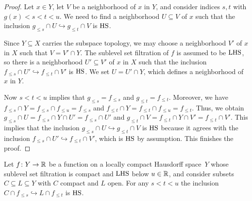 \begin{proof}
	Let $x \in Y$, let $V$ be a neighborhood of $x$ in $Y$, and consider indices $s,t$ with $g(x) < s < t < u$.
	We need to find a neighborhood $U \subseteq V$ of $x$ such that the inclusion $g_{\leq s} \cap U \hookrightarrow g_{\leq t} \cap V$ is $\mathrm{HS}$.

	Since $Y \subseteq X$ carries the subspace topology, we may choose a neighborhood $V'$ of $x$ in $X$ such that $V = V' \cap Y$.
	The sublevel set filtration of $f$ is assumed to be $\mathrm{LHS}$, so there is a neighborhood $U' \subseteq V'$ of $x$ in $X$ such that the inclusion $f_{\leq s} \cap U' \hookrightarrow f_{\leq t} \cap V'$ is $\mathrm{HS}$.
	We set $U = U' \cap Y$, which defines a neighborhood of $x$ in $Y$.

	Now $s < t < u$ implies that $g_{\leq s} = f_{\leq s}$ and $g_{\leq t} = f_{\leq t}$.
	Moreover, we have $f_{\leq s} \cap Y = f_{\leq s} \cap f_{\leq u} = f_{\leq s}$ and $f_{\leq t} \cap Y = f_{\leq t} \cap f_{\leq u} = f_{\leq t}$.
	Thus, we obtain $g_{\leq s} \cap U = f_{\leq s} \cap Y \cap U' = f_{\leq s} \cap U'$ and $g_{\leq t} \cap V = f_{\leq t} \cap Y \cap V' = f_{\leq t} \cap V'$.
	This implies that the inclusion $g_{\leq s} \cap U \hookrightarrow g_{\leq t} \cap V$ is $\mathrm{HS}$ because it agrees with the inclusion $f_{\leq s} \cap U' \hookrightarrow f_{\leq t} \cap V'$, which is $\mathrm{HS}$ by assumption.
	This finishes the proof.
\end{proof}

\begin{lem} \label{l:key lemma for q-tameness}
	Let $f \colon Y \to \mathbb{R}$ be a function on a locally compact Hausdorff space~$Y$ whose sublevel set filtration is compact and $\mathrm{LHS}$ below $u \in \mathbb{R}$, and consider subsets $C \subseteq L \subseteq Y$ with $C$ compact and $L$ open.
	For any $s < t < u$ the inclusion $C \cap f_{\leq s} \hookrightarrow L \cap f_{\leq t}$ is $\mathrm{HS}$.
\end{lem}

